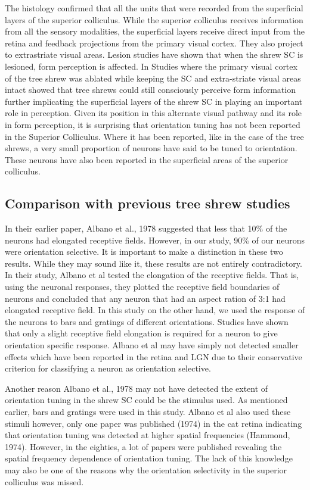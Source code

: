 \documentclass [12pt]{report}
\begin{document}
	The histology confirmed that all the units that were recorded from the superficial layers of the superior colliculus. While the superior colliculus receives information from all the sensory modalities, the superficial layers receive direct input from the retina and feedback projections from the primary visual cortex. They also project to extrastriate visual areas. Lesion studies have shown that when the shrew SC is lesioned, form perception is affected. In Studies where the primary visual cortex of the tree shrew was ablated while keeping the SC and extra-striate visual areas intact showed that tree shrews could still consciously perceive form information further implicating the superficial layers of the shrew SC in playing an important role in perception. Given its position in this alternate visual pathway and its role in form perception, it is surprising that orientation tuning has not been reported in the Superior Colliculus. Where it has been reported, like in the case of the tree shrews, a very small proportion of neurons have said to be tuned to orientation. These neurons have also been reported in the superficial areas of the superior colliculus. 
	
	\subsection{Comparison with previous tree shrew studies}
	
	In their earlier paper, Albano et al., 1978 suggested that less that 10\% of the neurons had elongated receptive fields. However, in our study, 90\% of our neurons were orientation selective. It is important to make a distinction in these two results. While they may sound like it, these results are not entirely contradictory. In their study, Albano et al tested the elongation of the receptive fields. That is, using the neuronal responses, they plotted the receptive field boundaries of neurons and concluded that any neuron that had an aspect ration of 3:1 had elongated receptive field. In this study on the other hand, we used the response of the neurons to bars and gratings of different orientations. Studies have shown that only a slight receptive field elongation is required for a neuron to give orientation specific response. Albano et al may have simply not detected smaller effects which have been reported in the retina and LGN due to their conservative criterion for classifying a neuron as orientation selective.
	
	Another reason Albano et al., 1978 may not have detected the extent of orientation tuning in the shrew SC could be the stimulus used. As mentioned earlier, bars and gratings were used in this study. Albano et al also used these stimuli however, only one paper was published (1974) in the cat retina indicating that orientation tuning was detected at higher spatial frequencies (Hammond, 1974). However, in the eighties, a lot of papers were published revealing the spatial frequency dependence of orientation tuning. The lack of this knowledge may also be one of the reasons why the orientation selectivity in the superior colliculus was missed.
	
\end{document}

